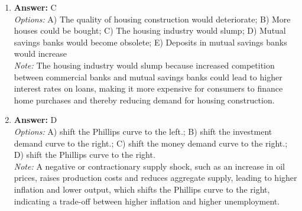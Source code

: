 \documentclass[12pt]{article}
\begin{document}
\begin{enumerate}[label=\arabic*.]
\item \textbf{Answer:} C
\\ \textit{Options:} A) The quality of housing construction would deteriorate; B) More houses could be bought; C) The housing industry would slump; D) Mutual savings banks would become obsolete; E) Deposits in mutual savings banks would increase
\\ \textit{Note:} The housing industry would slump because increased competition between commercial banks and mutual savings banks could lead to higher interest rates on loans, making it more expensive for consumers to finance home purchases and thereby reducing demand for housing construction.
\item \textbf{Answer:} D
\\ \textit{Options:} A) shift the Phillips curve to the left.; B) shift the investment demand curve to the right.; C) shift the money demand curve to the right.; D) shift the Phillips curve to the right.
\\ \textit{Note:} A negative or contractionary supply shock, such as an increase in oil prices, raises production costs and reduces aggregate supply, leading to higher inflation and lower output, which shifts the Phillips curve to the right, indicating a trade-off between higher inflation and higher unemployment.
\end{enumerate}
\end{document}
